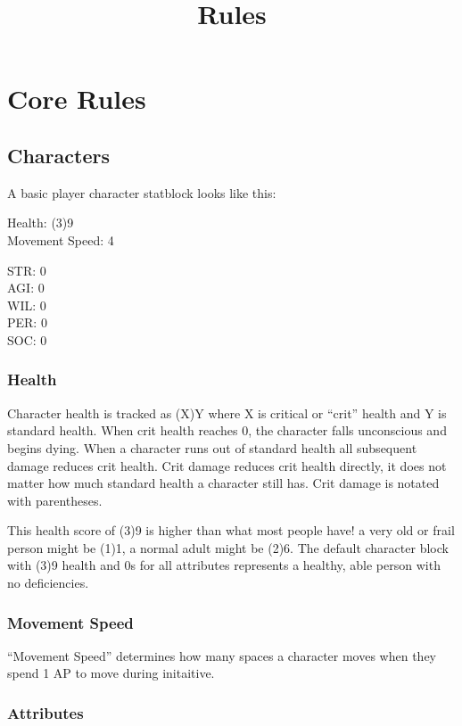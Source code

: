 \documentclass[
  letterpaper,
  DIV=11,
  numbers=noendperiod]{scrartcl}
\title{Rules}
\author{}
\date{}
\begin{document}
\maketitle

\section{Core Rules}\label{core-rules}

\subsection{Characters}\label{characters}

A basic player character statblock looks like this:

Health: (3)9\\
Movement Speed: 4

STR: 0\\
AGI: 0\\
WIL: 0\\
PER: 0\\
SOC: 0

\subsubsection{Health}\label{health}

Character health is tracked as (X)Y where X is critical or ``crit''
health and Y is standard health. When crit health reaches 0, the
character falls unconscious and begins dying. When a character runs out
of standard health all subsequent damage reduces crit health. Crit
damage reduces crit health directly, it does not matter how much
standard health a character still has. Crit damage is notated with
parentheses.

This health score of (3)9 is higher than what most people have! a very
old or frail person might be (1)1, a normal adult might be (2)6. The
default character block with (3)9 health and 0s for all attributes
represents a healthy, able person with no deficiencies.

\subsubsection{Movement Speed}\label{movement-speed}

``Movement Speed'' determines how many spaces a character moves when
they spend 1 AP to move during initaitive.

\subsubsection{Attributes}\label{attributes}
\end{document}
